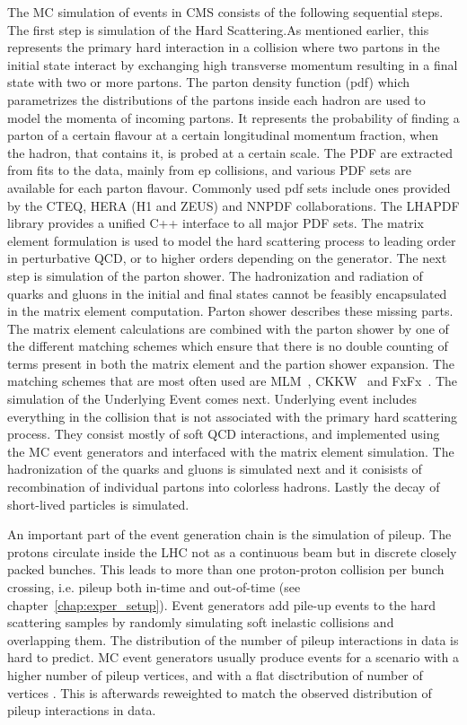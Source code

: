 The MC simulation of events in CMS consists of the following sequential steps. The first step is simulation of the Hard Scattering.As mentioned earlier, this represents the primary hard interaction in a collision where two partons in the initial state interact by exchanging high transverse momentum resulting in a final state with two or more partons. The parton density function (pdf) which parametrizes the distributions of the partons inside each hadron are used to model the momenta of incoming partons. It represents the probability of finding a parton of a certain flavour at a certain longitudinal momentum fraction, when the hadron, that contains it, is probed at a certain scale. The PDF are extracted from fits to the data, mainly from ep collisions, and various PDF sets are available for each parton flavour. Commonly used pdf sets include ones provided by the  CTEQ, HERA (H1 and ZEUS) and NNPDF collaborations. The LHAPDF library provides a unified C++ interface to all major PDF sets. The matrix element formulation is used to model the hard scattering process to leading order in perturbative QCD, or to higher orders depending on the generator. The next step is simulation of the parton shower. The hadronization and radiation of quarks and gluons in the initial and final states cannot be feasibly encapsulated in the matrix element computation. Parton shower describes these missing parts. The matrix element calculations are combined with the parton shower by one of the different matching schemes which ensure that there is no double counting of terms present in both the matrix element and the partion shower expansion. The matching schemes that are most often used are MLM~\cite{mlm}, CKKW~\cite{ckkw} and FxFx~\cite{Frederix:2012ps}. The simulation of the Underlying Event comes next. Underlying event includes everything in the collision that is not associated with the primary hard scattering process. They consist mostly of soft QCD interactions, and implemented using the MC event generators and interfaced with the matrix element simulation. The hadronization of the quarks and gluons is simulated next and it conisists of recombination of individual partons into colorless hadrons. Lastly the decay of short-lived particles is simulated.

An important part of the event generation chain is the simulation of pileup. The protons circulate inside the LHC not as a continuous beam but in discrete closely packed bunches. This leads to more than one proton-proton collision per bunch crossing, i.e. pileup both in-time and out-of-time (see chapter~\ref{chap:exper_setup}). Event generators add  pile-up events to the hard scattering samples by randomly simulating soft inelastic collisions and overlapping them. The distribution of the number of pileup interactions in data is hard to predict. MC event generators usually produce events for a scenario with a higher number of pileup vertices, and with a flat disctribution of number of vertices . This is afterwards reweighted to match the observed distribution of pileup interactions in data.


